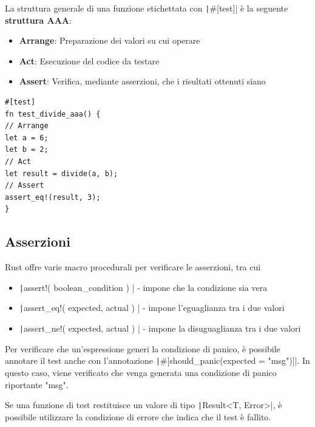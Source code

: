 \begin{flushleft}
  \begin{minipage}{0.65\linewidth}
    \raggedright
    La struttura generale di una funzione etichettata con \texttt|\#[test]| è la seguente \textbf{struttura AAA}:


    \begin{itemize}
      \item \textbf{Arrange}: Preparazione dei valori su cui operare
      \item \textbf{Act}: Esecuzione del codice da testare
      \item \textbf{Assert}: Verifica, mediante asserzioni, che i risultati ottenuti siano
    \end{itemize}
  \end{minipage}%
  \hfill
  \begin{minipage}{0.3\linewidth}
    \begin{verbatim}
#[test]
fn test_divide_aaa() {
// Arrange
let a = 6;
let b = 2;
// Act
let result = divide(a, b);
// Assert
assert_eq!(result, 3);
}
\end{verbatim}
  \end{minipage}
\end{flushleft}

\subsection{Asserzioni}

Rust offre varie macro procedurali per verificare le asserzioni, tra cui

\begin{itemize}
  \item \texttt|assert!( boolean_condition ) | - impone che la condizione sia vera
  \item \texttt|assert_eq!( expected, actual ) | - impone l'eguaglianza tra i due valori
  \item \texttt|assert_ne!( expected, actual ) | - impone la disuguaglianza tra i due valori
\end{itemize}

Per verificare che un'espressione generi la condizione di panico, è possibile
annotare il test anche con l'annotazione \texttt|#[should_panic(expected = "msg")]|.
In questo caso, viene verificato che venga generata una condizione di panico riportante "msg".

Se una funzione di test restituisce un valore di tipo \texttt|Result<T, Error>|, è
possibile utilizzare la condizione di errore che indica che il test è fallito.


